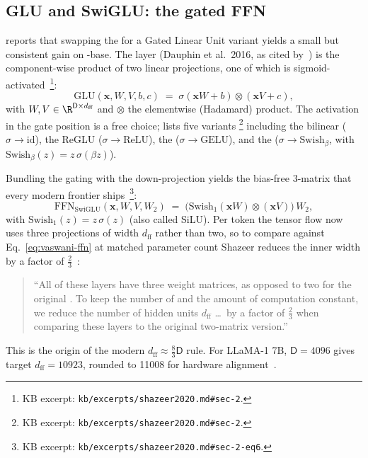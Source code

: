 \subsection{GLU and SwiGLU: the gated FFN}
\label{sec:ffn-swiglu}

\citet{shazeer2020} reports that swapping the  for a Gated Linear
Unit variant yields a small but consistent  gain on
-base. The  layer (Dauphin et al.\ 2016, as cited
by~\citealp[\S 2]{shazeer2020}) is the
component-wise product of two linear projections, one of which is
sigmoid-activated~\citep[\S 2, Eq.~4]{shazeer2020}\footnote{KB
excerpt: \nolinkurl{kb/excerpts/shazeer2020.md#sec-2}.}:
\begin{equation}
  \mathrm{GLU}(\mathbf{x}, W, V, b, c)
  \;=\; \sigma(\mathbf{x} W + b) \otimes (\mathbf{x} V + c),
  \tag{Shazeer--Eq.~4}
  \label{eq:glu}
\end{equation}
with $W, V \in \R^{\mathsf{D} \times d_{\text{ff}}}$ and $\otimes$
the elementwise (Hadamard) product. The activation in the gate
position is a free choice; \citet[\S 2, Eq.~5]{shazeer2020} lists
five variants%
\footnote{KB excerpt: \nolinkurl{kb/excerpts/shazeer2020.md#sec-2}.}
including the bilinear ($\sigma \to \mathrm{id}$), the ReGLU
($\sigma \to \mathrm{ReLU}$), the  ($\sigma \to \mathrm{GELU}$),
and the  ($\sigma \to \mathrm{Swish}_\beta$, with
$\mathrm{Swish}_\beta(z) = z\,\sigma(\beta z)$).

Bundling the gating with the down-projection yields the bias-free
3-matrix  that every modern frontier 
ships~\citep[\S 2, Eq.~6]{shazeer2020}\footnote{KB excerpt:
\nolinkurl{kb/excerpts/shazeer2020.md#sec-2-eq6}.}:
\begin{equation}
  \mathrm{FFN}_{\mathrm{SwiGLU}}(\mathbf{x}, W, V, W_2)
  \;=\; \bigl(\mathrm{Swish}_1(\mathbf{x} W) \otimes (\mathbf{x} V)\bigr)\, W_2,
  \tag{Shazeer--Eq.~6}
  \label{eq:swiglu}
\end{equation}
with $\mathrm{Swish}_1(z) = z\,\sigma(z)$ (also called SiLU). Per token
the tensor flow now uses three projections of width $d_{\text{ff}}$
rather than two, so to compare against
Eq.~\eqref{eq:vaswani-ffn} at matched parameter count Shazeer reduces
the inner width by a factor of $\tfrac{2}{3}$~\citep[\S 2]{shazeer2020}:
\begin{quote}
``All of these layers have three weight matrices, as opposed to two
for the original . To keep the number of  and the amount
of computation constant, we reduce the number of hidden units
$d_{\text{ff}}$ \dots\ by a factor of $\tfrac{2}{3}$ when comparing
these layers to the original two-matrix
version.''~\citep[\S 2]{shazeer2020}
\end{quote}
This is the origin of the modern $d_{\text{ff}} \approx
\tfrac{8}{3}\mathsf{D}$ rule. For LLaMA-1 7B, $\mathsf{D} = 4096$ gives
target $d_{\text{ff}} = 10923$, rounded to 11008 for hardware
alignment~\citep{touvron2023}.


